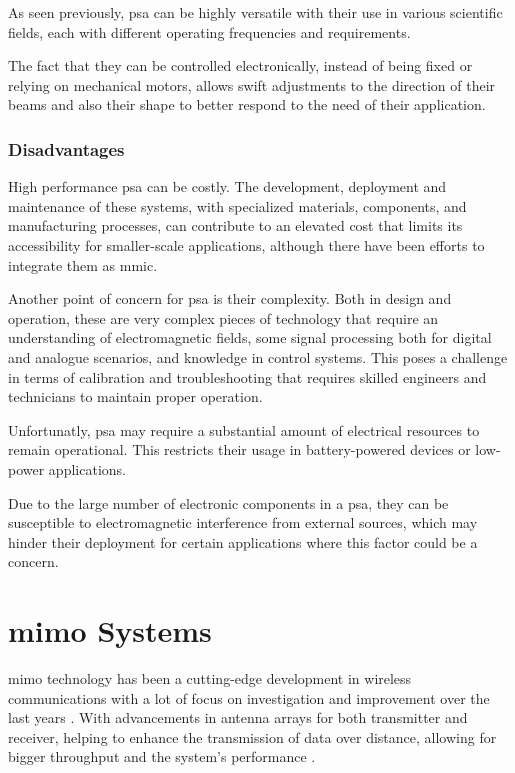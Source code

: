 \par As seen previously, \ac{psa} can be highly versatile with their use in various scientific fields, each with different operating frequencies and requirements.

\par The fact that they can be controlled electronically, instead of being fixed or relying on mechanical motors, allows swift adjustments to the direction of their beams and also their shape to better respond to the need of their application.

\subsubsection{Disadvantages}
\par High performance \ac{psa} can be costly. The development, deployment and maintenance of these systems, with specialized materials, components, and manufacturing processes, can contribute to an elevated cost that limits its accessibility for smaller-scale applications, although there have been efforts to integrate them as \ac{mmic}.

\par Another point of concern for \ac{psa} is their complexity. Both in design and operation, these are very complex pieces of technology that require an understanding of electromagnetic fields, some signal processing both for digital and analogue scenarios, and knowledge in control systems. This poses a challenge in terms of calibration and troubleshooting that requires skilled engineers and technicians to maintain proper operation.

\par Unfortunatly, \ac{psa} may require a substantial amount of electrical resources to remain operational. This restricts their usage in battery-powered devices or low-power applications.

\par Due to the large number of electronic components in a \ac{psa}, they can be susceptible to electromagnetic interference from external sources, which may hinder their deployment for certain applications where this factor could be a concern.

\section{\acl{mimo} Systems}
\par \ac{mimo} technology has been a cutting-edge development in wireless communications with a lot of focus on investigation and improvement over the last years \cite{Spencer2004AnDownlink}. With advancements in antenna arrays for both transmitter and receiver, helping to enhance the transmission of data over distance, allowing for bigger throughput and the system's performance \cite{Spencer2004AnDownlink}\cite{Alexandropoulos2022Full-DuplexDirections}\cite{Zhang2006FutureNetworks}.

